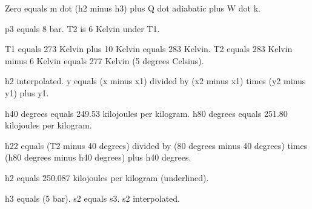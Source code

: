 Zero equals m dot (h2 minus h3) plus Q dot adiabatic plus W dot k.

p3 equals 8 bar. T2 is 6 Kelvin under T1.

T1 equals 273 Kelvin plus 10 Kelvin equals 283 Kelvin.
T2 equals 283 Kelvin minus 6 Kelvin equals 277 Kelvin (5 degrees Celsius).

h2 interpolated.
y equals (x minus x1) divided by (x2 minus x1) times (y2 minus y1) plus y1.

h40 degrees equals 249.53 kilojoules per kilogram.
h80 degrees equals 251.80 kilojoules per kilogram.

h22 equals (T2 minus 40 degrees) divided by (80 degrees minus 40 degrees) times (h80 degrees minus h40 degrees) plus h40 degrees.

h2 equals 250.087 kilojoules per kilogram (underlined).

h3 equals (5 bar). s2 equals s3. s2 interpolated.